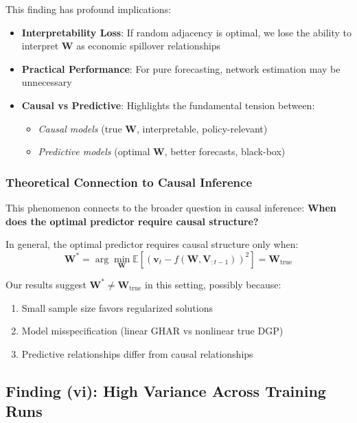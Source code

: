 \documentclass[10pt,a4paper]{article}
\begin{document}
This finding has profound implications:

\begin{itemize}
\item[\textcolor{red}{$\times$}] \textbf{Interpretability Loss}: If random adjacency is optimal, we lose the ability to interpret $\mathbf{W}$ as economic spillover relationships

\item[\textcolor{green}{$\checkmark$}] \textbf{Practical Performance}: For pure forecasting, network estimation may be unnecessary

\item[\textcolor{orange}{!}] \textbf{Causal vs Predictive}: Highlights the fundamental tension between:
\begin{itemize}
\item \textit{Causal models} (true $\mathbf{W}$, interpretable, policy-relevant)
\item \textit{Predictive models} (optimal $\mathbf{W}$, better forecasts, black-box)
\end{itemize}
\end{itemize}

\subsubsection{Theoretical Connection to Causal Inference}

This phenomenon connects to the broader question in causal inference: \textbf{When does the optimal predictor require causal structure?}

In general, the optimal predictor requires causal structure only when:
\begin{equation}
\mathbf{W}^* = \arg\min_{\mathbf{W}} \mathbb{E}[(\mathbf{v}_t - f(\mathbf{W}, \mathbf{V}_{:t-1}))^2] = \mathbf{W}_{\text{true}}
\end{equation}

Our results suggest $\mathbf{W}^* \neq \mathbf{W}_{\text{true}}$ in this setting, possibly because:
\begin{enumerate}
\item Small sample size favors regularized solutions
\item Model misspecification (linear GHAR vs nonlinear true DGP)
\item Predictive relationships differ from causal relationships
\end{enumerate}

\subsection{Finding (vi): High Variance Across Training Runs}
\end{document}
